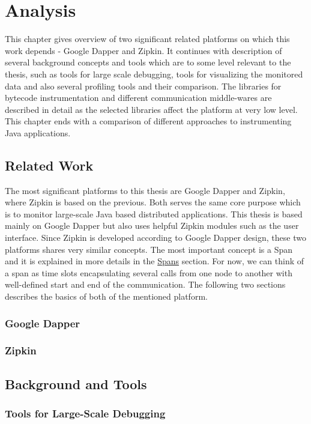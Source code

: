 \chapter{Analysis}
This chapter gives overview of two significant related platforms on which this work depends - Google Dapper and Zipkin. It continues with description of several background concepts and tools which are to some level relevant to the thesis, such as tools for large scale debugging, tools for visualizing the monitored data and also several profiling tools and their comparison. The libraries for bytecode instrumentation and different communication middle-wares are described in detail as the selected libraries affect the platform at very low level. This chapter ends with a comparison of different approaches to instrumenting Java applications.
\section{Related Work}
The most significant platforms to this thesis are Google Dapper and Zipkin, where Zipkin is based on the previous. Both serves the same core purpose which is to monitor large-scale Java based distributed applications. This thesis is based mainly on Google Dapper but also uses helpful Zipkin modules such as the user interface. Since Zipkin is developed according to Google Dapper design, these two platforms shares very similar concepts. The most important concept is a Span and it is explained in more details in the  \hyperref[subsec:Spans]{Spans} section. For now, we can think of a span as time slots encapsulating several calls from one node to another with well-defined start and end of the communication. The following two sections describes the basics of both of the mentioned platform.
\subsection{Google Dapper}
\subsection{Zipkin}

\section{Background and Tools}
\subsection{Tools for Large-Scale Debugging}
